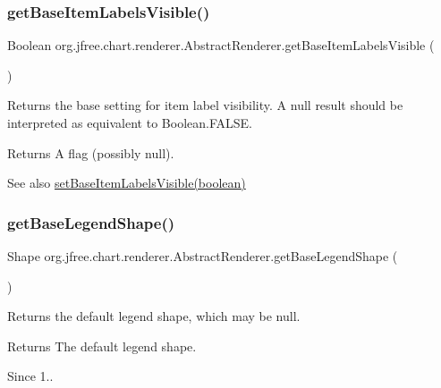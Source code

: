 \subsubsection{\texorpdfstring{get\+Base\+Item\+Labels\+Visible()}{getBaseItemLabelsVisible()}}
{\footnotesize\ttfamily Boolean org.\+jfree.\+chart.\+renderer.\+Abstract\+Renderer.\+get\+Base\+Item\+Labels\+Visible (\begin{DoxyParamCaption}{ }\end{DoxyParamCaption})}

Returns the base setting for item label visibility. A {\ttfamily null} result should be interpreted as equivalent to {\ttfamily Boolean.\+F\+A\+L\+SE}.

\begin{DoxyReturn}{Returns}
A flag (possibly {\ttfamily null}).
\end{DoxyReturn}
\begin{DoxySeeAlso}{See also}
\mbox{\hyperlink{classorg_1_1jfree_1_1chart_1_1renderer_1_1_abstract_renderer_aef1e2688293f0bdb55b4c4cdaf0fde9c}{set\+Base\+Item\+Labels\+Visible(boolean)}} 
\end{DoxySeeAlso}
\mbox{\label{classorg_1_1jfree_1_1chart_1_1renderer_1_1_abstract_renderer_aa45bf25afaedd7148a78f4e4d29cf572}} 
\subsubsection{\texorpdfstring{get\+Base\+Legend\+Shape()}{getBaseLegendShape()}}
{\footnotesize\ttfamily Shape org.\+jfree.\+chart.\+renderer.\+Abstract\+Renderer.\+get\+Base\+Legend\+Shape (\begin{DoxyParamCaption}{ }\end{DoxyParamCaption})}

Returns the default legend shape, which may be {\ttfamily null}.

\begin{DoxyReturn}{Returns}
The default legend shape.
\end{DoxyReturn}
\begin{DoxySince}{Since}
1.. 
\end{DoxySince}
\mbox{\label{classorg_1_1jfree_1_1chart_1_1renderer_1_1_abstract_renderer_a9cfa265593b1d02ecda6499a44b172a4}} 
